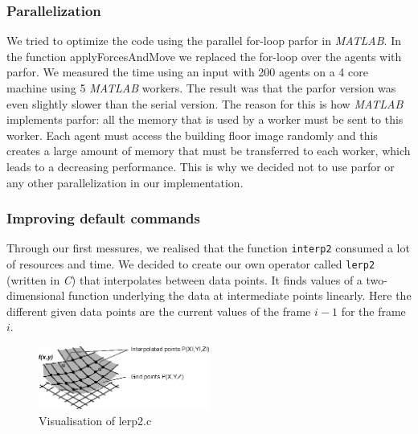 \documentclass[11pt]{article}
\begin{document}
\subsubsection{Parallelization}

We tried to optimize the code using the parallel for-loop parfor in \textit{MATLAB}. In
the function applyForcesAndMove we replaced the for-loop over the agents with
parfor. We measured the time using an input with 200 agents on a 4 core machine
using 5 \textit{MATLAB} workers. The result was that the parfor version was even slightly
slower than the serial version. The reason for this is how \textit{MATLAB} implements
parfor: all the memory that is used by a worker must be sent to this worker.
Each agent must access the building floor image randomly and this creates a
large amount of memory that must be transferred to each worker, which leads to a
decreasing performance.
This is why we decided not to use parfor or any other parallelization in our
implementation.

\subsubsection{Improving default commands}

Through our first messures, we realised that the function \verb+interp2+
consumed a lot of resources and time. We decided to create our own operator
called \verb+lerp2+ (written in \textit{C}) that interpolates between data points. It finds values of a
two-dimensional function  underlying the data at intermediate points linearly.
Here the different given data points are the current values of the frame $i-1$
for the frame $i$. 

\begin{figure}[h]
\centering
\includegraphics[width=0.5\textwidth]{./images/lerp2.png}
\caption{Visualisation of lerp2.c} 
\label{lerp2 image}
\end{figure}
\end{document}
